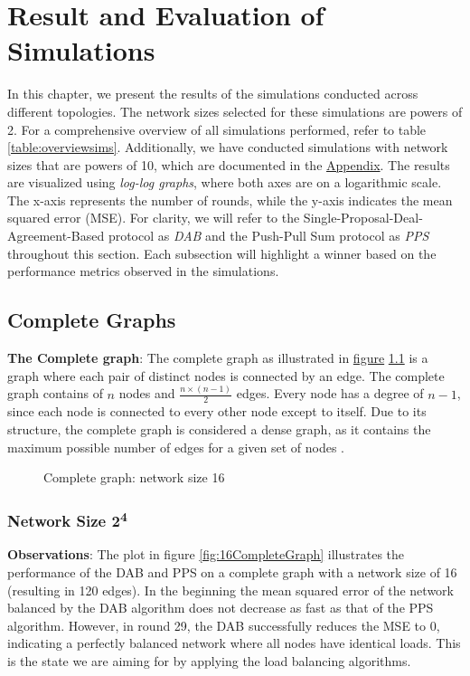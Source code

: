 \chapter{Result and Evaluation of Simulations}\label{chap:results}
In this chapter, we present the results of the simulations conducted across different topologies. The network sizes selected for these simulations are powers of 2. For a comprehensive overview of all simulations performed, refer to table \ref{table:overviewsims}. Additionally, we have conducted simulations with network sizes that are powers of 10, which are documented in the \hyperref[chap:appendix]{Appendix}.
The results are visualized using \textit{log-log graphs}, where both axes are on a logarithmic scale. The x-axis represents the number of rounds, while the y-axis indicates the mean squared error (MSE). For clarity, we will refer to the Single-Proposal-Deal-Agreement-Based protocol as \textit{DAB} and the Push-Pull Sum protocol as \textit{PPS} throughout this section. Each subsection will highlight a winner based on the performance metrics observed in the simulations.

\section{Complete Graphs}
\textbf{The Complete graph}: The complete graph as illustrated in \hyperref[fig:completegraphDemo]{figure} \ref{fig:completegraphDemo} is a graph where each pair of distinct nodes is connected by an edge. The complete graph contains of $n$ nodes and $\frac{n\times(n-1)}{2}$ edges. Every node has a degree of $n-1$, since each node is connected to every other node except to itself. Due to its structure, the complete graph is considered a dense graph, as it contains the maximum possible number of edges for a given set of nodes \cite{GraphTheorySchindelhaauer2021}.
\begin{figure}[H]
    \centering
    
    \caption{Complete graph: network size 16}
    \label{fig:completegraphDemo}
\end{figure}
\subsection{Network Size 2\textsuperscript{4}}
\textbf{Observations}: The plot in figure \ref{fig:16CompleteGraph} illustrates the performance of the DAB and PPS on a complete graph with a network size of 16 (resulting in 120 edges). In the beginning the mean squared error of the network balanced by the DAB algorithm does not decrease as fast as that of the PPS algorithm. However, in round 29, the DAB successfully reduces the MSE to 0, indicating a perfectly balanced network where all nodes have identical loads. This is the state we are aiming for by applying the load balancing algorithms.

